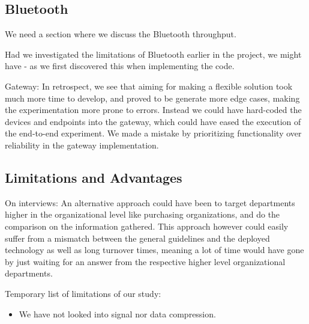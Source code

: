 
\subsection{Bluetooth} %
\label{sub:bluetooth}

We need a section where we discuss the Bluetooth throughput.

Had we investigated the limitations of Bluetooth earlier in the project, we might have - as we first discovered this when implementing the code.

Gateway: In retrospect, we see that aiming for making a flexible solution took much more time to develop, and proved to be generate more edge cases, making the experimentation more prone to errors. Instead we could have hard-coded the devices and endpoints into the gateway, which could have eased the execution of the end-to-end experiment. We made a mistake by prioritizing functionality over reliability in the gateway implementation.


\subsection{Limitations and Advantages} %
\label{sub:limitations}


On interviews: An alternative approach could have been to target departments higher in the organizational level like purchasing organizations, and do the comparison on the information gathered. This approach however could easily suffer from a mismatch between the general guidelines and the deployed technology as well as long turnover times, meaning a lot of time would have gone by just waiting for an answer from the respective higher level organizational departments.

Temporary list of limitations of our study:

\begin{itemize}

  \item We have not looked into signal nor data compression.

\end{itemize}

